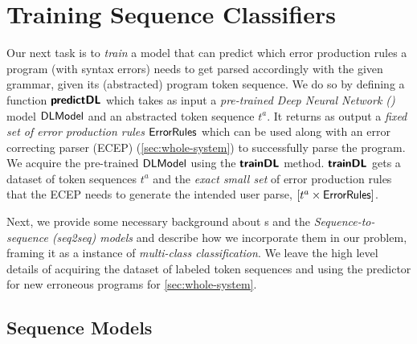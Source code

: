 \section{Training Sequence Classifiers}
\label{sec:seq-classifiers}

Our next task is to \emph{train} a model that can predict which error production
rules a program (with syntax errors) needs to get parsed accordingly with the
given grammar, given its (abstracted) program token sequence.
%
We do so by defining a function $\bm{\mathsf{predictDL}}$ which takes as input a
\emph{pre-trained Deep Neural Network (\dnn)} model $\mathsf{DLModel}$ and an abstracted
token sequence $t^a$.
%
It returns as output a \emph{fixed set of error production rules}
$\mathsf{ErrorRules}$ which can be used along with an error correcting parser (ECEP)
(\autoref{sec:whole-system}) to successfully parse the program.
%
We acquire the pre-trained $\mathsf{DLModel}$ using the $\bm{\mathsf{trainDL}}$ method.
$\bm{\mathsf{trainDL}}$ gets a dataset of token sequences $t^a$ and the \emph{exact small
set} of error production rules that the ECEP needs to generate the intended user
parse, \ie $[t^a \times \mathsf{ErrorRules}]$.

Next, we provide some necessary background about \dnn{}s and the
\emph{Sequence-to-sequence (seq2seq) models} and describe how we incorporate
them in our problem, framing it as a instance of \emph{multi-class
classification}. We leave the high level details of acquiring the dataset of
labeled token sequences and using the predictor for new erroneous programs for
\autoref{sec:whole-system}.


\subsection{Sequence Models}
\label{sec:seq-classifiers:seq-models}

